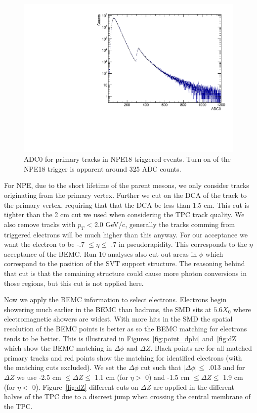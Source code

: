 \begin{figure}[htbp]
\begin{center}
\includegraphics[scale=.8]{Plots/NPE/ADC0_NPE18.pdf}
\end{center}
\caption[ADC0 Distribution for NPE18]{ADC0 for primary tracks in NPE18 triggered events. Turn on of the NPE18 trigger is apparent around 325 ADC counts.}
\label{fig:ADC0}
\end{figure}

For NPE, due to the short lifetime of the parent mesons, we only consider tracks originating from the primary vertex. Further we cut on the DCA of the track to the primary vertex, requiring that that the DCA be less than 1.5 cm. This cut is tighter than the 2 cm cut we used when considering the TPC track quality. We also remove tracks with $p_T$ < 2.0 GeV/c, generally the tracks comming from triggered electrons will be much higher than this anyway. For our acceptance we want the electron to be -.7 $\leq \eta \leq$ .7 in  pseudorapidity. This corresponds to the $\eta$ acceptance of the BEMC. Run 10 analyses also cut out areas in $\phi$ which correspond to the position of the SVT support structure. The reasoning behind that cut is that the remaining structure could cause more photon conversions in those regions, but this cut is not applied here.

Now we apply the BEMC information to select electrons. Electrons begin showering much earlier in the BEMC than hadrons, the SMD sits at $5.6 X_0$ where electromagnetic showers are widest. With more hits in the SMD the spatial resolution of the BEMC points is better as so the BEMC matching for electrons tends to be better. This is illustrated in Figures~\ref{fig:point_dphi} and~\ref{fig:dZ} which show the BEMC matching in $\Delta\phi$ and $\Delta Z$. Black points are for all matched primary tracks and red points show the matching for identified electrons (with the matching cuts excluded). We set the $\Delta\phi$ cut such that $|\Delta\phi| \leq$ .013 and for $\Delta Z$ we use -2.5 cm $\leq \Delta Z \leq$ 1.1 cm (for $\eta >$ 0) and -1.5 cm $\leq \Delta Z \leq$ 1.9 cm (for $\eta <$ 0). Figure~\ref{fig:dZ} different cuts on $\Delta Z$ are applied in the different halves of the TPC due to a discreet jump when crossing the central membrane of the TPC.

